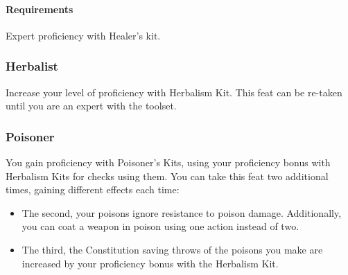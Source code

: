     \paragraph{Requirements} Expert proficiency with Healer's kit.

\subsubsection{Herbalist} \label{feat::herbalist}
    Increase your level of proficiency with Herbalism Kit.
    This feat can be re-taken until you are an expert with the toolset.
\subsubsection{Poisoner} \label{feat::poisoner}
    You gain proficiency with Poisoner's Kits, using your proficiency bonus with Herbalism Kits for checks using them.
    You can take this feat two additional times, gaining different effects each time:
    \begin{itemize}
        \item The second, your poisons ignore resistance to poison damage.
        Additionally, you can coat a weapon in poison using one action instead of two.
        \item The third, the Constitution saving throws of the poisons you make are increased by your proficiency bonus with the Herbalism Kit.
    \end{itemize}
